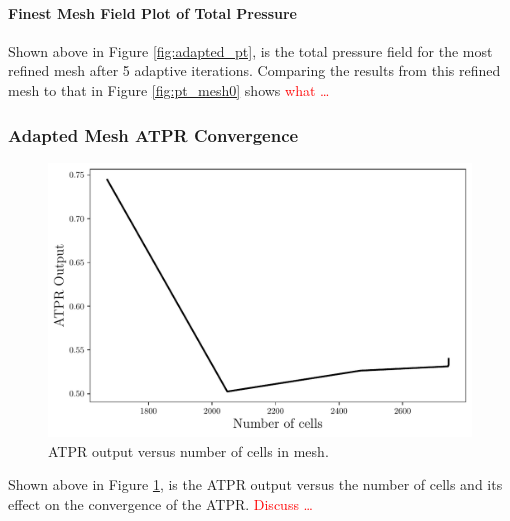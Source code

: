 \paragraph{Finest Mesh Field Plot of Total Pressure} Shown above in Figure \ref{fig:adapted_pt}, is the total pressure field for the most refined mesh after 5 adaptive iterations. Comparing the results from this refined mesh to that in Figure \ref{fig:pt_mesh0} shows \textcolor{red}{what \ldots}

\pagebreak
\subsubsection{Adapted Mesh ATPR Convergence}
\begin{figure}[h]
    \centering
    \includegraphics[width = 0.9\linewidth]{rep/q4/ATPR.pdf}
    \caption[ATPR Convergence with Cell Number]{ATPR output versus number of cells in mesh.}
    \label{fig:adapted_ATPR}
\end{figure}

Shown above in Figure \ref{fig:adapted_ATPR}, is the ATPR output versus the number of cells and its effect on the convergence of the ATPR. \textcolor{red}{Discuss \ldots}

